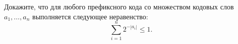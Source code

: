 Докажите, что для любого префиксного кода со множеством кодовых слов $a_1, \dots, a_n$ выполняется
следующее неравенство:
$$
    \sum\limits_{i = 1}^{n} 2^{-|a_i|} \le 1.
$$
